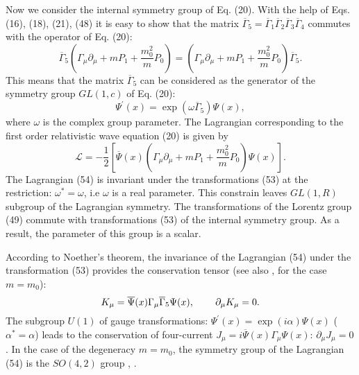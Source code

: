 \documentclass[a4paper,12pt]{article}
\begin{document}
Now we consider the internal symmetry group of Eq. (20). With the
help of Eqs. (16), (18), (21), (48) it is easy to show that the
matrix
 $\overline{\Gamma }_5=\overline{\Gamma
}_1\overline{\Gamma }_2 \overline{\Gamma }_3\overline{\Gamma }_4 $
commutes with the operator of Eq. (20):
\begin{equation}
\overline{\Gamma }_5\left( \Gamma _\mu
\partial_\mu +mP_1 +\frac{m_0^2}{m}P_0\right)=\left( \Gamma _\mu
\partial_\mu +mP_1 +\frac{m_0^2}{m}P_0\right)\overline{\Gamma }_5
. \label{52}
\end{equation}
This means that the matrix $\overline{\Gamma }_5$ can be
considered as the generator of the symmetry group $GL(1,c)$ of Eq.
(20):
\begin{equation}
\Psi ^{\prime }(x)=\exp \left(\omega\overline{\Gamma }_5\right)
\Psi (x) ,
 \label{53}
\end{equation}
where $\omega$ is the complex group parameter. The Lagrangian
corresponding to the first order relativistic wave equation (20)
is given by
\begin{equation}
\mathcal{L}=-\frac 12\left[ \overline{\Psi }(x)\left( \Gamma _\mu
\partial_\mu +mP_1 +\frac{m_0^2}{m}P_0\right) \Psi (x)\right] . \label{54}
\end{equation}
The Lagrangian (54) is invariant under the transformations (53) at
the restriction: $\omega^{*}=\omega $, i.e $\omega $ is a real
parameter. This constrain leaves $GL(1,R)$ subgroup of the
Lagrangian symmetry. The transformations of the Lorentz group (49)
commute with transformations (53) of the internal symmetry group.
As a result, the parameter of this group is a scalar.

According to Noether's theorem, the invariance of the Lagrangian
(54) under the transformation (53) provides the conservation
tensor (see also \cite{Kruglov1}, \cite{monogr} for the case
$m=m_0$):
\begin{equation}
 K_\mu = \overline{\Psi }(x)\Gamma _\mu
\overline{\Gamma }_5\Psi (x) ,\hspace{0.3in}\partial_\mu K_\mu =0
. \label{55}
\end{equation}
The subgroup $U(1)$ of gauge transformations: $\Psi ^{\prime
}(x)=\exp \left( i\alpha \right) \Psi (x)$ ($\alpha ^{*}=\alpha $)
leads to the conservation of four-current $J_\mu =i\overline{\Psi
}(x)\Gamma _\mu \Psi (x)$: $\partial_\mu J_\mu =0$. In the case of
the degeneracy $m=m_0$, the symmetry group of the Lagrangian (54)
is the $SO(4,2)$ group \cite{Kruglov1}, \cite{monogr}.
\end{document}
